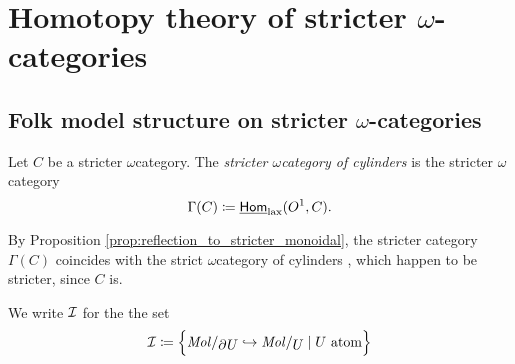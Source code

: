 \section{Homotopy theory of stricter \texorpdfstring{$\omega$}{ω}-categories} \label{sec:model}

\subsection{Folk model structure on stricter \texorpdfstring{$\omega$}{ω}-categories}

\begin{dfn} 
    Let \( C \) be a stricter \( \omega \)\nbd category.
    The \emph{stricter \( \omega \)\nbd category of cylinders} is the stricter \( \omega \)\nbd category 
    \begin{equation*}
       \Gamma(C) \coloneqq \underline{\mathsf{Hom}}_{\mathrm{lax}}(O^{1}, C). 
    \end{equation*}
\end{dfn}

\begin{rmk} \label{rmk:strict_stricter_same_cylinders}
    By Proposition \ref{prop:reflection_to_stricter_monoidal}, the stricter category \( \Gamma(C) \) coincides with the strict \( \omega \)\nbd category of cylinders \cite[Remark 20.2.9]{ara2025polygraphs}, which happen to be stricter, since \( C \) is.
\end{rmk}

\begin{dfn}
    We write \( \mathcal{I} \) for the the set
    \begin{equation*}
        \Icof \eqdef \set{\molecin{\bd{}{}U} \incl \molecin{U} \mid U \text{ atom}}
    \end{equation*}
\end{dfn}

